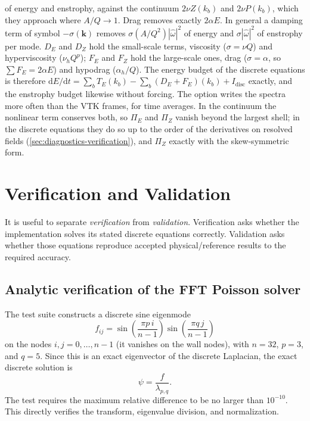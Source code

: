 \documentclass[11pt,a4paper]{article}
\newcommand{\code}[1]{\texttt{\detokenize{#1}}}
\begin{document}
of energy and enstrophy, against the continuum $2\nu Z(k_b)$ and $2\nu P(k_b)$, which they approach where $A/Q\to1$.  Drag removes exactly $2\alpha E$.  In general a damping term of symbol $-\sigma(\mathbf{k})$ removes $\sigma(A/Q^2)|\hat\omega|^2$ of energy and $\sigma|\hat\omega|^2$ of enstrophy per mode.  $D_E$ and $D_Z$ hold the small-scale terms, viscosity ($\sigma=\nu Q$) and hyperviscosity ($\nu_hQ^p$); $F_E$ and $F_Z$ hold the large-scale ones, drag ($\sigma=\alpha$, so $\sum F_E=2\alpha E$) and hypodrag ($\alpha_h/Q$).  The energy budget of the discrete equations is therefore $\mathrm{d}E/\mathrm{d}t=\sum_bT_E(k_b)-\sum_b(D_E+F_E)(k_b)+I_{\mathrm{disc}}$ exactly, and the enstrophy budget likewise without forcing.  The option \code{--spectrum-interval} writes the spectra more often than the VTK frames, for time averages.  In the continuum the nonlinear term conserves both, so $\Pi_E$ and $\Pi_Z$ vanish beyond the largest shell; in the discrete equations they do so up to the order of the derivatives on resolved fields (\cref{sec:diagnostics-verification}), and $\Pi_Z$ exactly with the skew-symmetric form.

\section{Verification and Validation}

It is useful to separate \emph{verification} from \emph{validation}.  Verification asks whether the implementation solves its stated discrete equations correctly.  Validation asks whether those equations reproduce accepted physical/reference results to the required accuracy.

\subsection{Analytic verification of the FFT Poisson solver}
\label{sec:verification-poisson}

The test suite constructs a discrete sine eigenmode
\begin{equation}
f_{ij}=\sin\left(\frac{\pi p\,i}{n-1}\right)
       \sin\left(\frac{\pi q\,j}{n-1}\right)
\end{equation}
on the nodes $i,j=0,\dots,n-1$ (it vanishes on the wall nodes), with $n=32$, $p=3$, and $q=5$.  Since this is an exact eigenvector of the discrete Laplacian, the exact discrete solution is
\begin{equation}
\psi=\frac{f}{\lambda_{p,q}}.
\end{equation}
The test requires the maximum relative difference to be no larger than $10^{-10}$.  This directly verifies the transform, eigenvalue division, and normalization.
\end{document}
